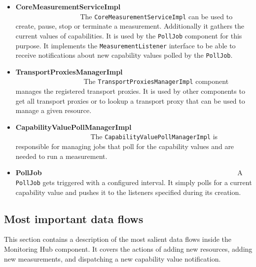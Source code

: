 \begin{itemize}
\item {\bf CoreMeasurementServiceImpl}~~~~~~~~~~~~~~~~~~~~~~~~~~~~~~~~~~~~~~~~~~~~~~~~~~~~~~~~\linebreak
The \texttt{CoreMeasurementServiceImpl} can be used to create, pause, stop or terminate a measurement. Additionally it gathers the current values of capabilities. It is used by the \texttt{PollJob} component for this purpose. It implements the \texttt{MeasurementListener} interface to be able to receive notifications about new capability values polled by the \texttt{PollJob}. 

\item {\bf TransportProxiesManagerImpl}~~~~~~~~~~~~~~~~~~~~~~~~~~~~~~~~~~~~~~~~~~~~~~~~~~~~~~~~\linebreak
The \texttt{TransportProxiesManagerImpl} component manages the registered transport proxies. It is used by other components to get all transport proxies or to lookup a transport proxy that can be used to manage a given resource.

\item {\bf CapabilityValuePollManagerImpl}~~~~~~~~~~~~~~~~~~~~~~~~~~~~~~~~~~~~~~~~~~~~~~~~~~~~~~~~\linebreak
The \texttt{CapabilityValuePollManagerImpl} is responsible for managing jobs that poll for the capability values and are needed to run a measurement.

\item {\bf PollJob}~~~~~~~~~~~~~~~~~~~~~~~~~~~~~~~~~~~~~~~~~~~~~~~~~~~~~~~~\linebreak
A \texttt{PollJob} gets triggered with a configured interval. It simply polls for a current capability value and pushes it to the listeners specified during its creation.

\end{itemize}

\subsection{Most important data flows}

This section contains a description of the most salient data flows inside the Monitoring Hub component. It covers the actions of adding new resources, adding new measurements, and dispatching a new capability value notification.

